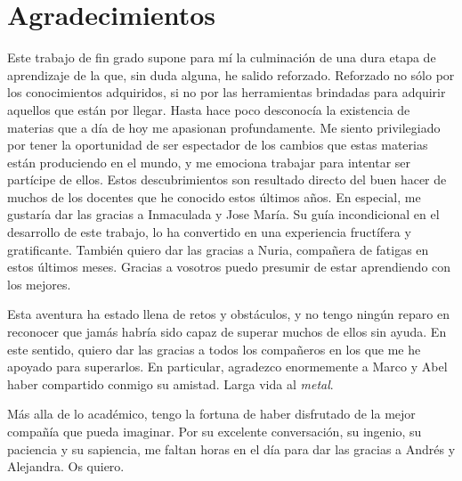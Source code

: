 
\chapter*{Agradecimientos}
Este trabajo de fin grado supone para mí la culminación de una dura etapa de aprendizaje de la que, sin duda alguna, he salido reforzado. Reforzado no sólo por los conocimientos adquiridos, si no por las herramientas brindadas para adquirir aquellos que están por llegar. Hasta hace poco desconocía la existencia de materias que a día de hoy me apasionan profundamente. Me siento privilegiado por tener la oportunidad de ser espectador de los cambios que estas materias están produciendo en el mundo, y me emociona trabajar para intentar ser partícipe de ellos. Estos descubrimientos son resultado directo del buen hacer de muchos de los docentes que he conocido estos últimos años. En especial, me gustaría dar las gracias a Inmaculada y Jose María. Su guía incondicional en el desarrollo de este trabajo, lo ha convertido en una experiencia fructífera y gratificante. También quiero dar las gracias a Nuria, compañera de fatigas en estos últimos meses. Gracias a vosotros puedo presumir de estar aprendiendo con los mejores.

Esta aventura ha estado llena de retos y obstáculos, y no tengo ningún reparo en reconocer que jamás habría sido capaz de superar muchos de ellos sin ayuda. En este sentido, quiero dar las gracias a todos los compañeros en los que me he apoyado para superarlos. En particular, agradezco enormemente a Marco y Abel haber compartido conmigo su amistad. Larga vida al \emph{metal}. 

Más alla de lo académico, tengo la fortuna de haber disfrutado de la mejor compañía que pueda imaginar. Por su excelente conversación, su ingenio, su paciencia y su sapiencia, me faltan horas en el día para dar las gracias a Andrés y Alejandra. Os quiero.

